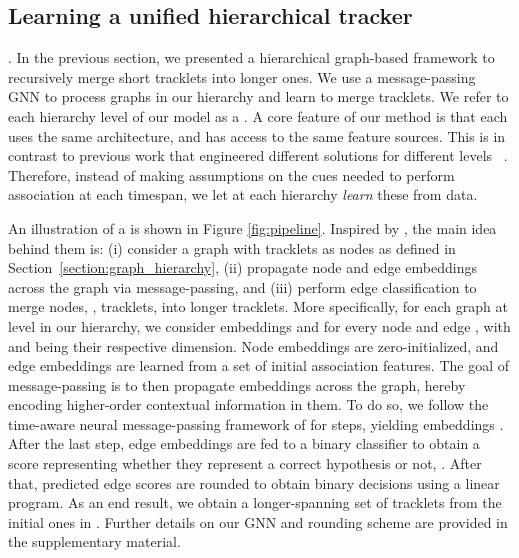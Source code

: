 \documentclass[10pt,twocolumn,letterpaper]{article}
\begin{document}
{{\subsection{Learning a unified hierarchical tracker} \label{features}
. In the previous section, we presented a hierarchical graph-based framework to recursively merge short tracklets into longer ones. We use a message-passing GNN to process graphs in our hierarchy and learn to merge tracklets. We refer to each hierarchy level of our model as a \textit{\blockname}. A core feature of our method is that each \blockname uses the same architecture, and has access to the same feature sources. This is in contrast to previous work that engineered different solutions for different levels ~\cite{mpntrack, lift, aplift, lpc}. Therefore, instead of making assumptions on the cues needed to perform association at each timespan, we let \blocknameplural at each hierarchy \textit{learn} these from data.

 An illustration of a \blockname is shown in Figure \ref{fig:pipeline}. Inspired by \cite{mpntrack}, the main idea behind them is: (i) consider a graph with tracklets as nodes as defined in Section~\ref{section:graph_hierarchy}, (ii) propagate node and edge embeddings across the graph via message-passing, and (iii) perform edge classification to merge nodes, \ie, tracklets, into longer tracklets. 
More specifically, for each graph  at level  in our hierarchy, we consider embeddings  and  for every node  and edge , with  and  being their respective dimension. 
Node embeddings are zero-initialized, and edge embeddings are learned from a set of initial association features.
The goal of message-passing is to then propagate embeddings across the graph, hereby encoding higher-order contextual information in them. To do so, we follow the time-aware neural message-passing framework of \cite{mpntrack} for  steps, yielding embeddings . 
After the last step, edge embeddings are fed to a binary classifier to obtain a score representing whether they represent a correct hypothesis or not, . After that, predicted edge scores are rounded to obtain binary decisions using a linear program. As an end result, we obtain a longer-spanning set of tracklets from the initial ones in . Further details on our GNN and rounding scheme are provided in the supplementary material.


}}
\end{document}
